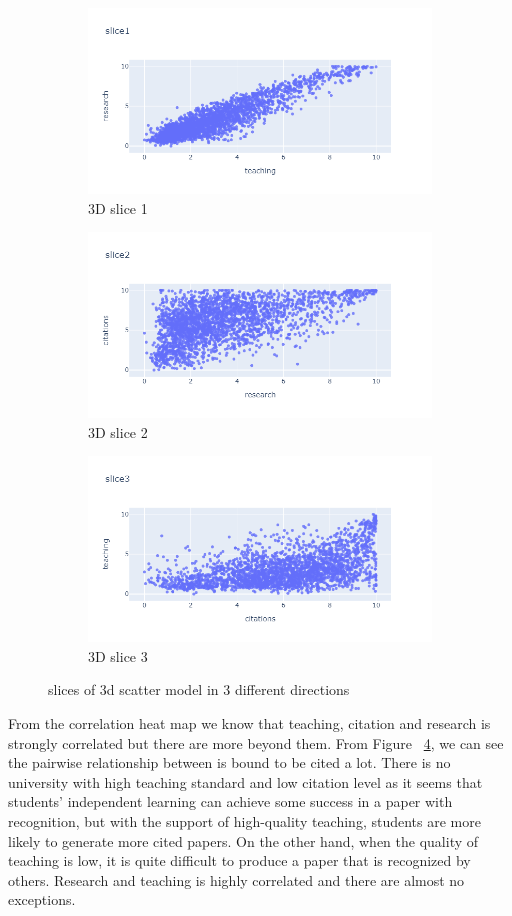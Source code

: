 \documentclass[a4paper]{article}
\begin{document}
\begin{figure}[h]
    \centering
    \begin{subfigure}{\textwidth}
        \centering
        \includegraphics[width=0.7\linewidth]{images/WPlot3.png}
        \caption{3D slice 1}
        \label{subfig:1}
    \end{subfigure}
    \begin{subfigure}{\textwidth}
        \centering
        \includegraphics[width=0.7\linewidth]{images/WPlot4.png}
        \caption{3D slice 2}
        \label{subfig:2}
    \end{subfigure}
    \begin{subfigure}{\textwidth}
        \centering
        \includegraphics[width=0.7\linewidth]{images/WPlot5.png}
        \caption{3D slice 3}
        \label{subfig:3}
    \end{subfigure}
    \caption{slices of 3d scatter model in 3 different directions}
    \label{fig:fig:3}
\end{figure}

\FloatBarrier
From the correlation heat map we know that teaching, citation and research is strongly correlated but there are more beyond them. From Figure ~\ref{fig:fig:3}, we can see the pairwise relationship between is bound to be cited a lot. There is no university with high teaching standard and low citation level as it seems that students' independent learning can achieve some success in a paper with recognition, but with the support of high-quality teaching, students are more likely to generate more cited papers. On the other hand, when the quality of teaching is low, it is quite difficult to produce a paper that is recognized by others. Research and teaching is highly correlated and there are almost no exceptions.
\end{document}
